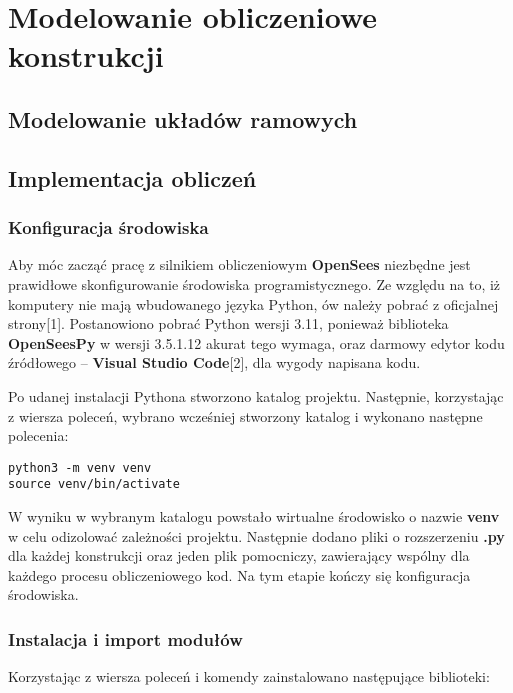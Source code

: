 \newpage
\section{Modelowanie obliczeniowe konstrukcji}

\subsection{Modelowanie układów ramowych}

\subsection{Implementacja obliczeń}
\subsubsection{Konfiguracja środowiska}

Aby móc zacząć pracę z silnikiem obliczeniowym \textbf{OpenSees} niezbędne jest prawidłowe skonfigurowanie środowiska programistycznego.
Ze względu na to, iż komputery nie mają wbudowanego języka Python, ów należy pobrać z oficjalnej strony[1].
Postanowiono pobrać Python wersji 3.11, ponieważ biblioteka \textbf{OpenSeesPy} w wersji 3.5.1.12 akurat tego wymaga,
oraz darmowy edytor kodu źródłowego – \textbf{Visual Studio Code}[2], dla wygody napisana kodu.

Po udanej instalacji Pythona stworzono katalog projektu.
Następnie, korzystając z wiersza poleceń, wybrano wcześniej stworzony katalog i wykonano następne polecenia:

\begin{lstlisting}
python3 -m venv venv
source venv/bin/activate
\end{lstlisting}

W wyniku w wybranym katalogu powstało wirtualne środowisko o nazwie \textbf{venv} w celu odizolować zależności projektu.
Następnie dodano pliki o rozszerzeniu \textbf{.py} dla każdej konstrukcji oraz jeden plik pomocniczy, zawierający wspólny
dla każdego procesu obliczeniowego kod.
Na tym etapie kończy się konfiguracja środowiska.

\subsubsection{Instalacja i import modułów}

Korzystając z wiersza poleceń i komendy  zainstalowano następujące biblioteki:

